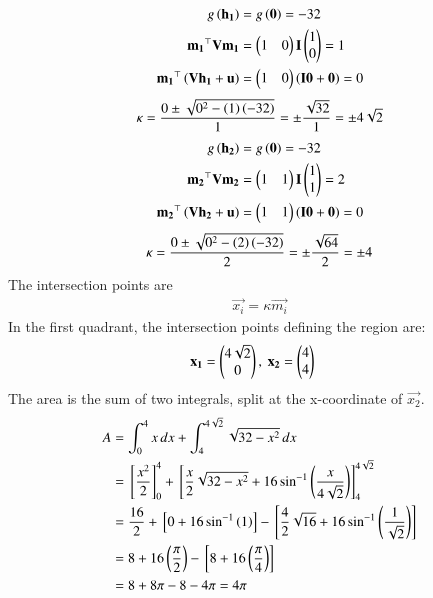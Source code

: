 \documentclass[journal]{IEEEtran}
\begin{document}
\begin{align}
    g\left(\mathbf{h_1}\right) &= g\left(\mathbf{0}\right) = -32 \\
    \mathbf{m_1}^\top\mathbf{V}\mathbf{m_1} &= \begin{pmatrix}1&0\end{pmatrix}\mathbf{I}\begin{pmatrix}1\\0\end{pmatrix} = 1 \\
    \mathbf{m_1}^\top\left(\mathbf{V}\mathbf{h_1}+\mathbf{u}\right) &= \begin{pmatrix}1&0\end{pmatrix}\left(\mathbf{I}\mathbf{0}+\mathbf{0}\right) = 0
\end{align}
\begin{align}
    \kappa = \frac{0 \pm \sqrt{0^2 - \left(1\right)\left(-32\right)}}{1} = \pm\frac{\sqrt{32}}{1} = \pm 4\sqrt{2}
\end{align}
\begin{align}
    g\left(\mathbf{h_2}\right) &= g\left(\mathbf{0}\right) = -32 \\
    \mathbf{m_2}^\top\mathbf{V}\mathbf{m_2} &= \begin{pmatrix}1&1\end{pmatrix}\mathbf{I}\begin{pmatrix}1\\1\end{pmatrix} = 2 \\
    \mathbf{m_2}^\top\left(\mathbf{V}\mathbf{h_2}+\mathbf{u}\right) &= \begin{pmatrix}1&1\end{pmatrix}\left(\mathbf{I}\mathbf{0}+\mathbf{0}\right) = 0
\end{align}
\begin{align}
    \kappa = \frac{0 \pm \sqrt{0^2 - \left(2\right)\left(-32\right)}}{2} = \pm\frac{\sqrt{64}}{2} = \pm 4
\end{align}
The intersection points are
\begin{align}
    \vec{x_i} = \kappa \vec{m_i}
\end{align}
In the first quadrant, the intersection points defining the region are:
\begin{align}
    \mathbf{x_1} &= \begin{pmatrix}4\sqrt{2} \\ 0\end{pmatrix}, \text{ } \mathbf{x_2} = \begin{pmatrix}4 \\ 4\end{pmatrix}
\end{align}
The area is the sum of two integrals, split at the x-coordinate of $\vec{x_2}$.
\begin{align}
    A &= \int_{0}^{4} x \, dx + \int_{4}^{4\sqrt{2}} \sqrt{32-x^2} \, dx \\
    &= {}\left[ \frac{x^2}{2} \right]_{0}^{4} + {}\left[ \frac{x}{2}\sqrt{32-x^2} + 16\sin^{-1}\left(\frac{x}{4\sqrt{2}}\right) \right]_{4}^{4\sqrt{2}} \\
    &= \frac{16}{2} + {}\left[ 0 + 16\sin^{-1}\left(1\right) \right] - {}\left[ \frac{4}{2}\sqrt{16} + 16\sin^{-1}\left(\frac{1}{\sqrt{2}}\right) \right] \\
    &= 8 + 16\left(\frac{\pi}{2}\right) - {}\left[ 8 + 16\left(\frac{\pi}{4}\right) \right] \\
    &= 8 + 8\pi - 8 - 4\pi = 4\pi
\end{align}
\end{document}
